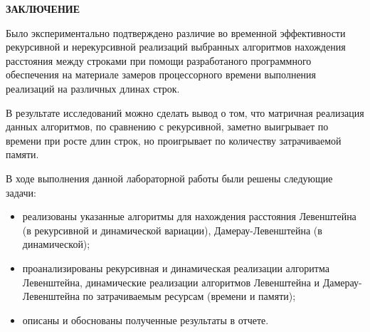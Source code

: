 \begin{center}
    \textbf{ЗАКЛЮЧЕНИЕ}
\end{center}

Было экспериментально подтверждено различие во временной эффективности рекурсивной
и нерекурсивной реализаций выбранных алгоритмов нахождения расстояния между строками при
помощи разработаного программного обеспечения на материале замеров процессорного
времени выполнения реализаций на различных длинах строк. 

В результате исследований можно сделать вывод о том, что матричная
реализация данных алгоритмов, по сравнению с рекурсивной, заметно выигрывает по
времени при росте длин строк, но проигрывает по количеству затрачиваемой памяти.

\vspace{5mm}

В ходе выполнения данной лабораторной работы были решены следующие задачи:
\begin{itemize}
	\item реализованы указанные алгоритмы для нахождения расстояния Левенштейна
            (в рекурсивной и динамической вариации), Дамерау-Левенштейна (в динамической);
	\item проанализированы рекурсивная и динамическая реализации алгоритма Левенштейна,
            динамические реализации алгоритмов Левенштейна и Дамерау-Левенштейна
            по затрачиваемым ресурсам (времени и памяти);
	\item описаны и обоснованы полученные результаты в отчете.
\end{itemize}\vspace{5mm}
